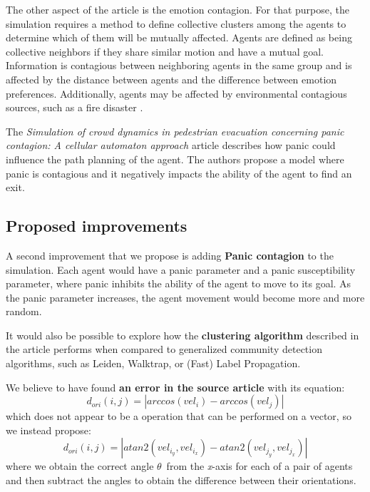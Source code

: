 \documentclass[9pt]{pnas-new}
\begin{document}
The other aspect of the article is the emotion contagion. For that purpose, the simulation requires a method to define collective clusters among the agents to determine which of them will be mutually affected. Agents are defined as being collective neighbors if they share similar motion and have a mutual goal. Information is contagious between neighboring agents in the same group and is affected by the distance between agents and the difference between emotion preferences. Additionally, agents may be affected by environmental contagious sources, such as a fire disaster \cite{Wu_Huang_Tian_Yan_Yu_2024}.  

The \textit{Simulation of crowd dynamics in pedestrian evacuation concerning panic contagion: A cellular automaton approach} article describes how panic could influence the path planning of the agent.
The authors propose a model where panic is contagious and it negatively impacts the ability of the agent to find an exit.\cite{Wang_2022}
\subsection{Proposed improvements}


A second improvement that we propose is adding \textbf{Panic contagion} to the simulation. Each agent would have a panic parameter and a panic susceptibility parameter, where panic inhibits the ability of the agent to move to its goal. As the panic parameter increases, the agent movement would become more and more random.

It would also be possible to explore how the \textbf{clustering algorithm} described in the article performs when compared to generalized community detection algorithms, such as Leiden, Walktrap, or (Fast) Label Propagation.



We believe to have found \textbf{an error in the source article} with its equation: \begin{equation*}
    d_{ori}(i,j)=|arccos(vel_i)-arccos(vel_j)|
\end{equation*}
which does not appear to be a operation that can be performed on a vector, so we instead propose: \begin{equation*}
    d_{ori}(i,j)=|atan2(vel_{i_y},vel_{i_x})-atan2(vel_{j_y},vel_{j_x})|
\end{equation*}
where we obtain the correct angle ${\theta}$\ from the \textit{x}-axis \cite{wikiatan2} for each of a pair of agents and then subtract the angles to obtain the difference between their orientations.
\cite{Wu_Huang_Tian_Yan_Yu_2024}
\end{document}
